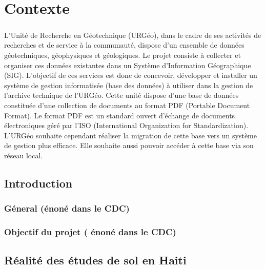 \chapter{Contexte}
\paragraph{}
L’Unité de Recherche en Géotechnique (URGéo), dans le cadre de ses activités de recherches et de service à la communauté, dispose d’un ensemble de données géotechniques, géophysiques et géologiques. Le projet consiste à collecter et organiser ces données existantes dans un Système d’Information Géographique (SIG). L’objectif de ces services est donc de concevoir, développer et installer un système de gestion informatisée (base des données) à utiliser dans la gestion de l’archive technique de l’URGéo. Cette unité dispose d'une base de données constituée d’une collection de documents au format PDF (Portable Document Format). Le format PDF est un standard ouvert d'échange de documents électroniques géré par l’ISO (International Organization for Standardization). L’URGéo  souhaite cependant réaliser la migration de cette base vers un système de gestion plus efficace. Elle souhaite aussi pouvoir accéder à cette base via son réseau local.
    \section{Introduction}
        \subsection{Géneral (énoné dans le CDC)}
        \lipsum[1]
        \subsection{Objectif du projet ( énoné dans le CDC)}
        \lipsum[1]
    \section{Réalité des études de sol en Haiti}

